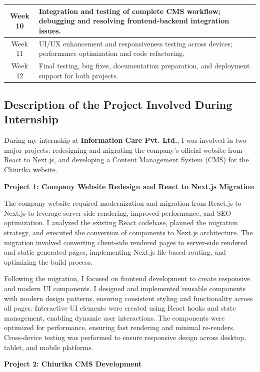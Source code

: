 \begin{table}[H]
\begin{tabular}{|c|p{13cm}|}
Week 10 & Integration and testing of complete CMS workflow; debugging and resolving frontend-backend integration issues. \\
\hline

Week 11 & UI/UX enhancement and responsiveness testing across devices; performance optimization and code refactoring. \\
\hline

Week 12 & Final testing, bug fixes, documentation preparation, and deployment support for both projects. \\
\hline

\end{tabular}
\end{table}

\subsection{Description of the Project Involved During Internship}

During my internship at \textbf{Information Care Pvt. Ltd.}, I was involved in two major projects: redesigning and migrating the company's official website from React to Next.js, and developing a Content Management System (CMS) for the Chiurika website.

\textbf{Project 1: Company Website Redesign and React to Next.js Migration}

The company website required modernization and migration from React.js to Next.js to leverage server-side rendering, improved performance, and SEO optimization. I analyzed the existing React codebase, planned the migration strategy, and executed the conversion of components to Next.js architecture. The migration involved converting client-side rendered pages to server-side rendered and static generated pages, implementing Next.js file-based routing, and optimizing the build process.

Following the migration, I focused on frontend development to create responsive and modern UI components. I designed and implemented reusable components with modern design patterns, ensuring consistent styling and functionality across all pages. Interactive UI elements were created using React hooks and state management, enabling dynamic user interactions. The components were optimized for performance, ensuring fast rendering and minimal re-renders. Cross-device testing was performed to ensure responsive design across desktop, tablet, and mobile platforms.

\textbf{Project 2: Chiurika CMS Development}

